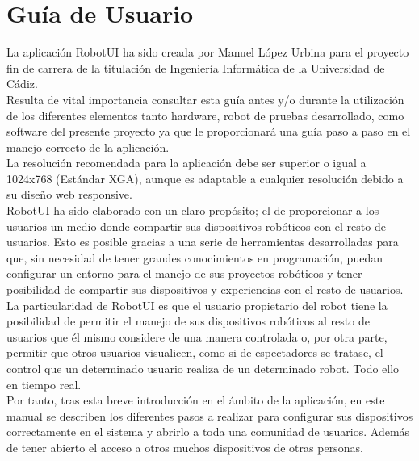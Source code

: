 \newpage


\chapter{ Guía de Usuario}
\label{chap:manual-usuario}

La aplicación RobotUI ha sido creada por Manuel López Urbina para el proyecto fin de carrera de la titulación de Ingeniería Informática de la Universidad de Cádiz.\\

Resulta de vital importancia consultar esta guía antes y/o durante la utilización de los diferentes elementos tanto hardware, robot de pruebas desarrollado, como software del presente proyecto ya 
que le proporcionará una guía paso a paso en el manejo correcto de la aplicación.\\

La resolución recomendada para la aplicación debe ser superior o igual a 1024x768 (Estándar XGA), aunque es adaptable a cualquier resolución debido a su diseño web responsive.\\

RobotUI ha sido elaborado con un claro propósito; el de  proporcionar a los usuarios un medio donde compartir sus dispositivos robóticos con el resto de usuarios. Esto es posible gracias a una serie de
herramientas desarrolladas para que, sin necesidad de tener grandes conocimientos en programación, puedan configurar un entorno para el manejo de sus proyectos robóticos y tener 
posibilidad de compartir sus dispositivos y experiencias con el resto de usuarios.\\

La particularidad de RobotUI es que el usuario propietario del robot tiene la posibilidad de permitir el manejo de sus dispositivos robóticos al resto de usuarios que él mismo considere de una 
manera controlada o, por otra parte, permitir que otros usuarios visualicen, como si de espectadores se tratase, el control que un determinado usuario realiza de un determinado robot.
Todo ello en tiempo real.\\

Por tanto, tras esta breve introducción en el ámbito de la aplicación, en este manual se describen los diferentes pasos a realizar para configurar sus dispositivos correctamente en el sistema
y abrirlo a toda una comunidad de usuarios. Además de tener abierto el acceso a otros muchos dispositivos de otras personas.\\

